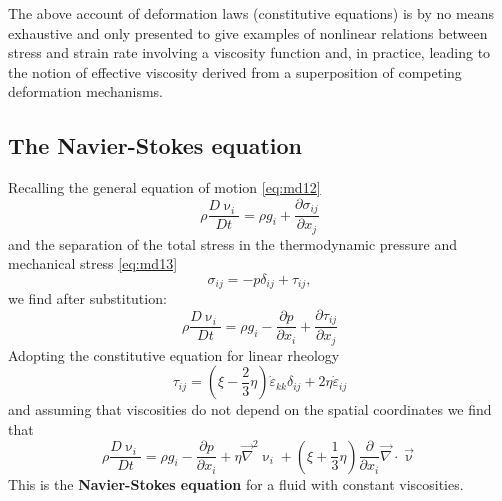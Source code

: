 The above account of deformation laws (constitutive equations) is by no means
exhaustive and only presented to give examples of nonlinear relations between stress and
strain rate involving a viscosity function and, in practice, leading to the notion of
effective viscosity derived from a superposition of competing deformation mechanisms.



\vspace{0.5cm}
\vspace{0.5cm}


\subsection{The Navier-Stokes equation}

Recalling the general equation of motion \eqref{eq:md12}
\[
\rho \frac{D\upnu_i}{Dt} = \rho g_i + \frac{\partial \sigma_{ij}}{\partial x_j}
\]
and the separation of
the total stress in the thermodynamic pressure and mechanical stress \eqref{eq:md13}
\begin{equation}
\sigma_{ij} = -p \delta_{ij} + \tau_{ij},
\end{equation}
we find after substitution:
\begin{equation}
\rho \frac{D\upnu_i}{Dt}=\rho g_i -\frac{\partial p}{\partial x_i}+\frac{\partial \tau_{ij}}{\partial x_j}
\label{eq:md31}
\end{equation}
Adopting the constitutive equation for linear rheology
\begin{equation}
\tau_{ij} = (\xi - \frac23 \eta) \dot\varepsilon_{kk} \delta_{ij} + 2\eta \dot\varepsilon_{ij}
\end{equation}
and assuming that viscosities do not
depend on the spatial coordinates we find that 
\begin{equation}
\rho \frac{D\upnu_i}{Dt}=\rho g_i -\frac{\partial p}{\partial x_i}+ \eta \vec\nabla^2 \upnu_i
+ (\xi+\frac13 \eta) \frac{\partial}{\partial x_i} \vec\nabla\cdot\vec\upnu
\label{eq:md33}
\end{equation}
This is the {\bf Navier-Stokes equation} for a fluid with constant viscosities.

